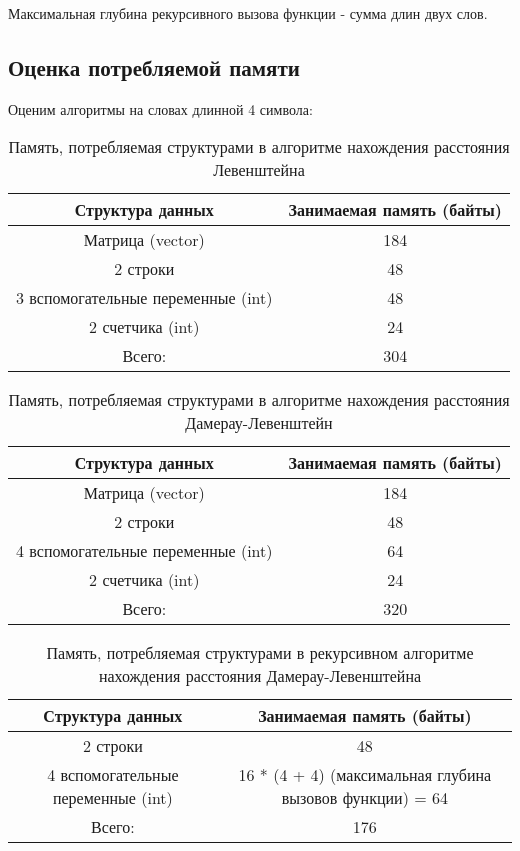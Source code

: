 \documentclass[a4paper, 14pt]{article}
\begin{document}
	Максимальная глубина рекурсивного вызова функции - сумма длин двух слов. 
	
	\subsection{Оценка потребляемой памяти}
	
	Оценим алгоритмы на словах длинной 4 символа:\\
	
\begin{table}[H]
\begin{center}
\caption{Память, потребляемая структурами в алгоритме нахождения расстояния Левенштейна}
	\begin{tabular}{|c|c|}
	\hline 
	Структура данных & Занимаемая память (байты) \\ 
	\hline 
	Матрица (vector) & 184 \\ 
	\hline 
	2 строки & 48 \\ 
	\hline 
	3 вспомогательные переменные (int) & 48 \\ 
	\hline 
	2 счетчика (int) & 24 \\ 
	\hline 
	Всего: & 304 \\ 
	\hline 
	\end{tabular}
	\end{center}
	\end{table}	

\begin{table}[H]
\begin{center}
\caption{Память, потребляемая структурами в алгоритме нахождения расстояния Дамерау-Левенштейн}
	\begin{tabular}{|c|c|}
	\hline 
	Структура данных & Занимаемая память (байты) \\ 
	\hline 
	Матрица (vector) & 184 \\ 
	\hline 
	2 строки & 48 \\ 
	\hline 
	4 вспомогательные переменные (int) & 64 \\ 
	\hline 
	2 счетчика (int) & 24 \\ 
	\hline 
	Всего: & 320 \\ 
	\hline 
	\end{tabular} 
	\end{center}
	\end{table}	
	
\begin{table}[H]
\begin{center}
\caption{Память, потребляемая структурами в рекурсивном алгоритме нахождения расстояния Дамерау-Левенштейна}
	\begin{tabular}{|c|c|}
	\hline 
	Структура данных & Занимаемая память (байты) \\ 
	\hline 
	2 строки & 48 \\ 
	\hline 
	4 вспомогательные переменные (int) & 16  * (4  + 4) (максимальная глубина вызовов функции) = 64\\ 
	\hline 
	Всего: & 176 \\ 
	\hline 
	\end{tabular}
	\end{center}
	\end{table}	
	
\end{document}
